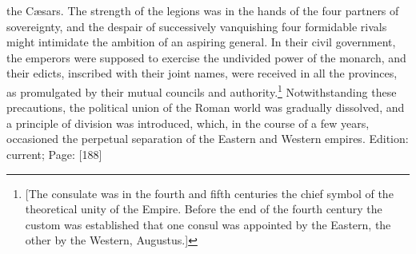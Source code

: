 the Cæsars. The strength of the legions was in the hands of the four partners of sovereignty, and the despair of successively vanquishing four formidable rivals might intimidate the ambition of an aspiring general. In their civil government, the emperors were supposed to exercise the undivided power of the monarch, and their edicts, inscribed with their joint names, were received in all the provinces, as promulgated by their mutual councils and authority.\footnote{[The consulate was in the fourth and fifth centuries the chief symbol of the theoretical unity of the Empire. Before the end of the fourth century the custom was established that one consul was appointed by the Eastern, the other by the Western, Augustus.]} Notwithstanding these precautions, the political union of the Roman world was gradually dissolved, and a principle of division was introduced, which, in the course of a few years, occasioned the perpetual separation of the Eastern and Western empires.
Edition: current; Page: [188]


